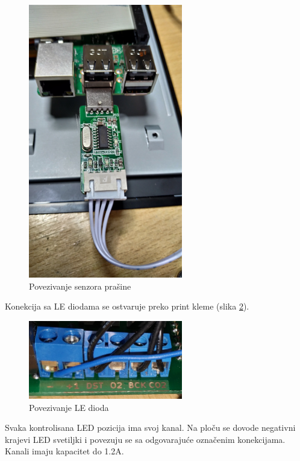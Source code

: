 \documentclass[a4paper]{article}
\begin{document}
	\begin{figure}[H]
		\centering
		\includegraphics[width=0.6\textwidth]{graphics/dustConection.jpg}
		\caption{Povezivanje senzora pra\v sine}
		\label{fig:usb}
	\end{figure}
	
	Konekcija sa LE diodama se ostvaruje preko print kleme (slika \ref{fig:LED}). 
	\begin{figure}[H]
		\centering
		\includegraphics[width=0.6\textwidth]{graphics/LEDs.jpg}
		\caption{Povezivanje LE dioda}
		\label{fig:LED}		
	\end{figure}		
	Svaka kontrolisana LED 
	pozicija ima svoj kanal. Na plo\v cu se dovode negativni krajevi LED svetiljki i povezuju se sa 
	odgovaraju\' ce ozna\v cenim konekcijama. Kanali imaju kapacitet do 1.2A.
	
\end{document}
